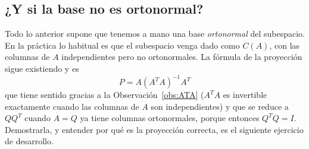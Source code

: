 \subsection*{¿Y si la base no es ortonormal?}

Todo lo anterior supone que tenemos a mano una base \emph{ortonormal} del
subespacio. En la práctica lo habitual es que el subespacio venga dado como
$C(A)$, con las columnas de $A$ independientes pero no ortonormales. La
fórmula de la proyección sigue existiendo y es
\begin{equation}\label{eq:proyeccion-general}
\boxed{\ P=A(A^T A)^{-1}A^T\ }
\end{equation}
que tiene sentido gracias a la Observación~\ref{obs:ATA} ($A^TA$ es
invertible exactamente cuando las columnas de $A$ son independientes) y que
se reduce a $QQ^T$ cuando $A=Q$ ya tiene columnas ortonormales, porque
entonces $Q^TQ=I$. Demostrarla, y entender por qué es la proyección correcta,
es el siguiente ejercicio de desarrollo.

